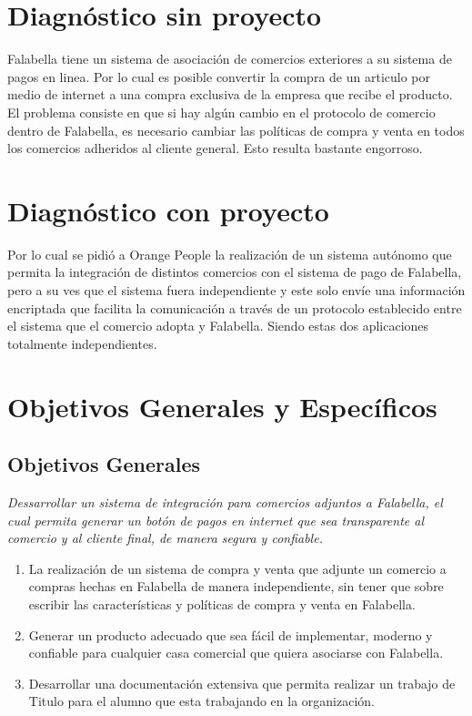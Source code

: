 \documentclass[a4paper,12pt,openany,oneside]{book}
\begin{document}
\section{Diagnóstico sin proyecto}
Falabella tiene un sistema de asociación de comercios exteriores a su sistema de pagos en linea. Por lo cual es posible convertir la compra de un articulo por medio de internet a una compra exclusiva de la empresa que recibe el producto. El problema consiste en que si hay algún cambio en el protocolo de comercio dentro de Falabella, es necesario cambiar las políticas de compra y venta en todos los comercios adheridos al cliente general. Esto resulta bastante engorroso. 
\section{Diagnóstico con proyecto}
Por lo cual se pidió a Orange People la realización de un sistema autónomo que permita la integración de distintos comercios con el sistema de pago de Falabella, pero a su ves que el sistema fuera independiente y este solo envíe una información encriptada que facilita la comunicación a través de un protocolo establecido entre el sistema que el comercio adopta y Falabella. Siendo estas dos aplicaciones totalmente independientes.
\section{Objetivos Generales y Específicos}
\subsection{Objetivos Generales}
\textit{Dessarrollar un sistema de integración para comercios adjuntos a Falabella, el cual permita generar un botón de pagos en internet que sea transparente al comercio y al cliente final, de manera segura y confiable.}
\begin{enumerate}
\item La realización de un sistema de compra y venta que adjunte un comercio a compras hechas en Falabella de manera independiente, sin tener que sobre escribir las características y políticas de compra y venta en Falabella.
\item Generar un producto adecuado que sea fácil de implementar, moderno y confiable para cualquier casa comercial que quiera asociarse con Falabella.
\item Desarrollar una documentación extensiva que permita realizar un trabajo de Titulo para el alumno que esta trabajando en la organización.
\end{enumerate}
\end{document}

